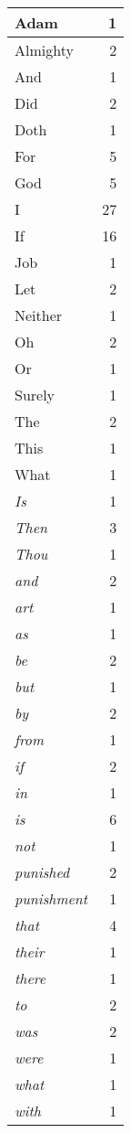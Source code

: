 \begin{center}
\begin{longtable}{l|r}
\hline \hline
\endlastfoot
Adam & 1 \\ \hline
Almighty & 2 \\ \hline
And & 1 \\ \hline
Did & 2 \\ \hline
Doth & 1 \\ \hline
For & 5 \\ \hline
God & 5 \\ \hline
I & 27 \\ \hline
If & 16 \\ \hline
Job & 1 \\ \hline
Let & 2 \\ \hline
Neither & 1 \\ \hline
Oh & 2 \\ \hline
Or & 1 \\ \hline
Surely & 1 \\ \hline
The & 2 \\ \hline
This & 1 \\ \hline
What & 1 \\ \hline
\emph{Is} & 1 \\ \hline
\emph{Then} & 3 \\ \hline
\emph{Thou} & 1 \\ \hline
\emph{and} & 2 \\ \hline
\emph{art} & 1 \\ \hline
\emph{as} & 1 \\ \hline
\emph{be} & 2 \\ \hline
\emph{but} & 1 \\ \hline
\emph{by} & 2 \\ \hline
\emph{from} & 1 \\ \hline
\emph{if} & 2 \\ \hline
\emph{in} & 1 \\ \hline
\emph{is} & 6 \\ \hline
\emph{not} & 1 \\ \hline
\emph{punished} & 2 \\ \hline
\emph{punishment} & 1 \\ \hline
\emph{that} & 4 \\ \hline
\emph{their} & 1 \\ \hline
\emph{there} & 1 \\ \hline
\emph{to} & 2 \\ \hline
\emph{was} & 2 \\ \hline
\emph{were} & 1 \\ \hline
\emph{what} & 1 \\ \hline
\emph{with} & 1 \\ \hline

\end{longtable}
\end{center}
